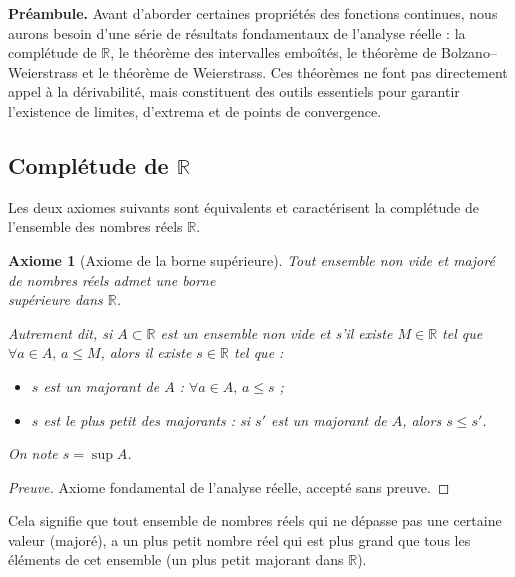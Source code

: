 \documentclass{report} %
\theoremstyle{definition}  %
\theoremstyle{plain} %
\newtheorem{axiom}{Axiome}
\theoremstyle{remark} %
\begin{document}
\medskip

\medskip
\noindent
\textbf{Préambule.}  
Avant d’aborder certaines propriétés des fonctions continues, nous aurons besoin
d’une série de résultats fondamentaux de l’analyse réelle : la complétude de \(\mathbb{R}\),
le théorème des intervalles emboîtés, le théorème de Bolzano--Weierstrass et
le théorème de Weierstrass.
Ces théorèmes ne font pas directement appel à la dérivabilité,
mais constituent des outils essentiels pour garantir l’existence de limites,
d’extrema et de points de convergence.

\medskip

\subsection{\textbf{Complétude de \(\mathbb{R}\)}}

\medskip
\noindent
Les deux axiomes suivants sont équivalents et caractérisent 
la complétude de l’ensemble des nombres réels \(\mathbb{R}\).

\medskip

\begin{axiom}[Axiome de la borne supérieure]
{\sloppy Tout ensemble non vide et majoré de nombres réels admet une borne \\
supérieure dans \(\mathbb{R}\).}

\medskip
\noindent
Autrement dit, si \( A \subset \mathbb{R} \) est un ensemble non vide et s'il existe \( M \in \mathbb{R} \) tel que \( \forall a \in A, \, a \leq M \), alors il existe \( s \in \mathbb{R} \) tel que :
\begin{itemize}
    \item \( s \) est un majorant de \( A \) : \( \forall a \in A, \, a \leq s \) ;
    \item \( s \) est le plus petit des majorants : si \( s' \) est un majorant de \( A \), alors \( s \leq s' \).
\end{itemize}
On note \( s = \sup A \).
\end{axiom}

\medskip

\begin{proof}[Preuve]
Axiome fondamental de l'analyse réelle, accepté sans preuve.
\end{proof}

\medskip
\noindent
Cela signifie que tout ensemble de nombres réels qui ne dépasse pas une certaine valeur (majoré), 
a un plus petit nombre réel qui est plus grand que tous les éléments de cet ensemble (un plus
petit majorant dans \(\mathbb{R}\)).
\medskip
\end{document}
